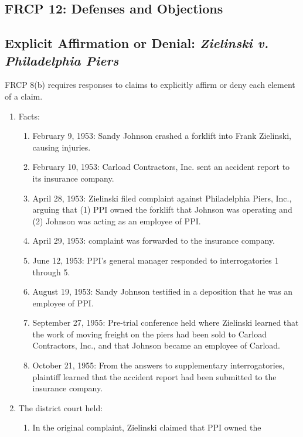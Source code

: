 \subsection{FRCP 12: Defenses and Objections}

\subsection{Explicit Affirmation or Denial: \emph{Zielinski v. Philadelphia 
Piers}}

FRCP 8(b) requires responses to claims to explicitly affirm or deny each 
element of a claim.

\begin{enumerate}
    \item Facts:
    \begin{enumerate}
        \item February 9, 1953: Sandy Johnson crashed a forklift into Frank 
        Zielinski, causing injuries.
        \item February 10, 1953: Carload Contractors, Inc. sent an accident 
        report to its insurance company.
        \item April 28, 1953: Zielinski filed complaint against Philadelphia 
        Piers, Inc., arguing that (1) PPI owned the forklift that Johnson was 
        operating and (2) Johnson was acting as an employee of PPI.
        \item April 29, 1953: complaint was forwarded to the insurance 
        company.
        \item June 12, 1953: PPI's general manager responded to 
        interrogatories 1 through 5.
        \item August 19, 1953: Sandy Johnson testified in a deposition that he 
        was an employee of PPI.
        \item September 27, 1955: Pre-trial conference held where Zielinski 
        learned that the work of moving freight on the piers had been sold to 
        Carload Contractors, Inc., and that Johnson became an employee of 
        Carload.
        \item October 21, 1955: From the answers to supplementary 
        interrogatories, plaintiff learned that the accident report had been 
        submitted to the insurance company.
    \end{enumerate}
    \item The district court held:
    \begin{enumerate}
        \item In the original complaint, Zielinski claimed that PPI owned the 

\end{enumerate}
\end{enumerate}
